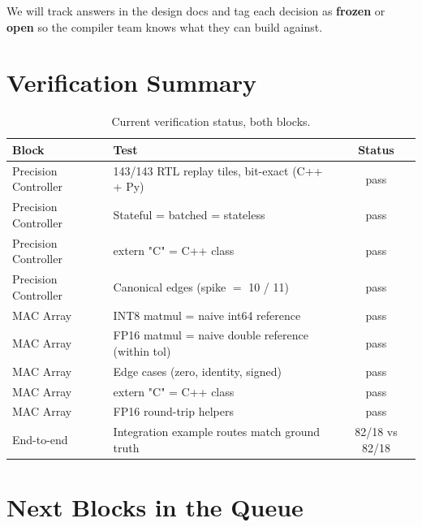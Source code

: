 \documentclass[11pt]{article}
\begin{document}
We will track answers in the design docs and tag each decision as
\textbf{frozen} or \textbf{open} so the compiler team knows what
they can build against.

\section{Verification Summary}
\label{sec:verif}

\begin{table}[ht]
\centering
\small
\caption{Current verification status, both blocks.}
\label{tab:verif}
\begin{tabular}{@{}l l c@{}}
\toprule
Block                   & Test                                              & Status \\
\midrule
Precision Controller    & 143/143 RTL replay tiles, bit-exact (C++ + Py)    & pass \\
Precision Controller    & Stateful = batched = stateless                    & pass \\
Precision Controller    & extern "C" = C++ class                            & pass \\
Precision Controller    & Canonical edges (spike $=$ 10 / 11)               & pass \\
MAC Array               & INT8 matmul = naive int64 reference               & pass \\
MAC Array               & FP16 matmul = naive double reference (within tol) & pass \\
MAC Array               & Edge cases (zero, identity, signed)               & pass \\
MAC Array               & extern "C" = C++ class                            & pass \\
MAC Array               & FP16 round-trip helpers                           & pass \\
End-to-end              & Integration example routes match ground truth     & 82/18 vs 82/18 \\
\bottomrule
\end{tabular}
\end{table}

\section{Next Blocks in the Queue}
\label{sec:next}
\end{document}
